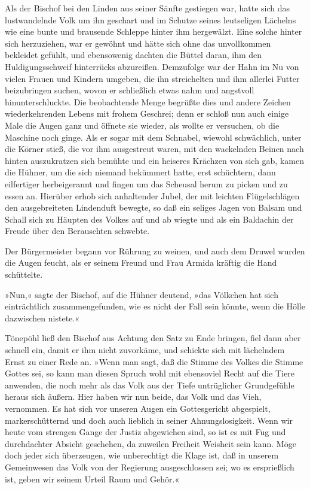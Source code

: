Als der Bischof bei den Linden aus seiner Sänfte gestiegen war,
hatte sich das lustwandelnde Volk um ihn \pagenum{[47]} geschart
und im Schutze seines leutseligen Lächelns wie eine bunte und
brausende Schleppe hinter ihm hergewälzt. Eine solche hinter sich
herzuziehen, war er gewöhnt und hätte sich ohne das unvollkommen
bekleidet gefühlt, und ebensowenig dachten die Büttel daran, ihm
den Huldigungsschweif hinterrücks abzureißen. Demzufolge war der
Hahn im Nu von vielen Frauen und Kindern umgeben, die ihn
streichelten und ihm allerlei Futter beizubringen suchen, wovon er
schließlich etwas nahm und angstvoll hinunterschluckte. Die
beobachtende Menge begrüßte dies und andere Zeichen wiederkehrenden
Lebens mit frohem Geschrei; denn er schloß nun auch einige Male die
Augen ganz und öffnete sie wieder, als wollte er versuchen, ob die
Maschine noch ginge. Als er sogar mit dem Schnabel, wiewohl
schwächlich, unter die Körner stieß, die vor ihm ausgestreut waren,
mit den wackelnden Beinen nach hinten auszukratzen sich bemühte und
ein heiseres Krächzen von sich gab, kamen die Hühner, um die sich
niemand bekümmert hatte, erst schüchtern, dann eilfertiger
herbeigerannt und fingen um das Scheusal herum zu picken und zu
essen an. Hierüber erhob sich anhaltender Jubel, der mit leichten
Flügelschlägen den ausgebreiteten Lindenduft bewegte, so daß ein
seliges Jagen von Balsam und Schall sich zu Häupten des Volkes auf
und ab wiegte und als ein Baldachin der Freude über den Berauschten
schwebte.

Der Bürgermeister begann vor Rührung zu weinen, und auch dem Druwel
wurden die Augen feucht, als er seinem Freund und Frau Armida
kräftig die Hand schüttelte.

»Nun,« sagte der Bischof, auf die Hühner deutend, »das Völkchen hat
sich einträchtlich zusammengefunden, wie es nicht der Fall sein
könnte, wenn die Hölle dazwischen nistete.«

\pagenum{[48]} Tönepöhl ließ den Bischof aus Achtung den Satz zu
Ende bringen, fiel dann aber schnell ein, damit er ihm nicht
zuvorkäme, und schickte sich mit lächelndem Ernst zu einer Rede an.
»Wenn man sagt, daß die Stimme des Volkes die Stimme Gottes sei, so
kann man diesen Spruch wohl mit ebensoviel Recht auf die Tiere
anwenden, die noch mehr als das Volk aus der Tiefe untrüglicher
Grundgefühle heraus sich äußern. Hier haben wir nun beide, das Volk
und das Vieh, vernommen. Es hat sich vor unseren Augen ein
Gottesgericht abgespielt, markerschütternd und doch auch lieblich
in seiner Ahnungslosigkeit. Wenn wir heute vom strengen Gange der
Justiz abgewichen sind, so ist es mit Fug und durchdachter Absicht
geschehen, da zuweilen Freiheit Weisheit sein kann. Möge doch jeder
sich überzeugen, wie unberechtigt die Klage ist, daß in unserem
Gemeinwesen das Volk von der Regierung ausgeschlossen sei; wo es
ersprießlich ist, geben wir seinem Urteil Raum und Gehör.«

